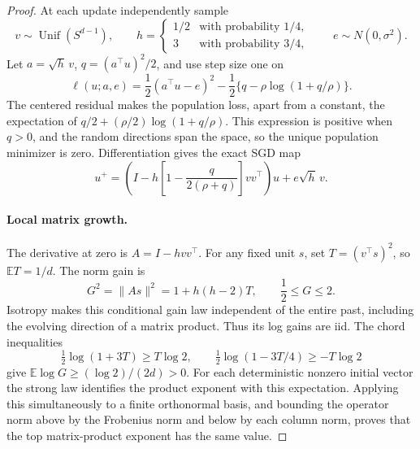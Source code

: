 \begin{proof}
At each update independently sample
\[
 v\sim\operatorname{Unif}(S^{d-1}),\qquad
 h=\begin{cases}1/2&\text{with probability }1/4,\\
                 3&\text{with probability }3/4,
   \end{cases}
 \qquad e\sim N(0,\sigma^2).
\]
Let $a=\sqrt h\,v$, $q=(a^\top u)^2/2$, and use step size one on
\begin{equation}
 \ell(u;a,e)=\frac12(a^\top u-e)^2
 -\frac12\{q-\rho\log(1+q/\rho)\}.
 \label{eq:highdim-loss}
\end{equation}
The centered residual makes the population loss, apart from a
constant, the expectation of
$q/2+(\rho/2)\log(1+q/\rho)$. This expression is positive when $q>0$,
and the random directions span the space, so the unique population
minimizer is zero. Differentiation gives the exact SGD map
\begin{equation}
 u^+=\left(I-h\left[1-\frac{q}{2(\rho+q)}\right]vv^\top\right)u
       +e\sqrt h\,v.
 \label{eq:highdim-exact-map}
\end{equation}

\paragraph{Local matrix growth.}
The derivative at zero is $A=I-hvv^\top$. For any fixed unit $s$, set
$T=(v^\top s)^2$, so $\mathbb ET=1/d$. The norm gain is
\[
 G^2=\|As\|^2=1+h(h-2)T,\qquad \frac12\le G\le2.
\]
Isotropy makes this conditional gain law independent of the entire
past, including the evolving direction of a matrix product. Thus its
log gains are iid. The chord inequalities
\[
 \tfrac12\log(1+3T)\ge T\log2,
 \qquad \tfrac12\log(1-3T/4)\ge-T\log2
\]
give $\mathbb E\log G\ge(\log2)/(2d)>0$.
For each deterministic nonzero initial vector the strong law identifies
the product exponent with this expectation. Applying this simultaneously
to a finite orthonormal basis, and bounding the operator norm above by
the Frobenius norm and below by each column norm, proves that the top
matrix-product exponent has the same value.


\end{proof}
